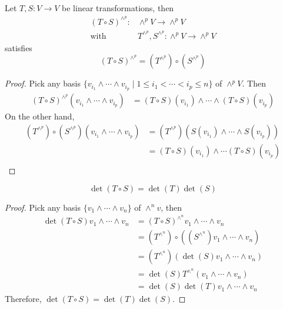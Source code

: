 \begin{proposition}
Let $T,S:V\to V$ be linear transformations, then
\[
\begin{array}{ll}
(T\circ S)^{\wedge^p}:&\wedge^pV\to \wedge^pV\\
\text{with}&T^{\wedge^p},S^{\wedge^p}:\wedge^pV\to \wedge^pV
\end{array}
\]
satisfies
\[
(T\circ S)^{\wedge^p} = (T^{\wedge^p})\circ(S^{\wedge^p})
\]
\end{proposition}

\begin{proof}
Pick any basis $\{v_{i_1}\wedge\cdots\wedge v_{i_p}\mid 1\le i_1<\cdots<i_p\le n\}$ of $\wedge^pV$.
Then
\begin{align*}
(T\circ S)^{\wedge^p}(v_{i_1}\wedge\cdots\wedge v_{i_p})&=
(T\circ S)(v_{i_1})\wedge\cdots\wedge(T\circ S)(v_{i_p})
\end{align*}
On  the other hand,
\begin{align*}
(T^{\wedge^p})\circ(S^{\wedge^p})(v_{i_1}\wedge\cdots\wedge v_{i_p})
&=
(T^{\wedge^p})(S(v_{i_1})\wedge\cdots\wedge S(v_{i_p}))\\
&=
(T\circ S)(v_{i_1})\wedge\cdots (T\circ S)(v_{i_p})\\
\end{align*}


\end{proof}

\begin{corollary}
\[
\det(T\circ S) = \det(T)\det(S)
\]
\end{corollary}

\begin{proof}
Pick any basis $\{v_1\wedge\cdots\wedge v_n\}$ of $\wedge^nv$, then
\begin{align*}
\det(T\circ S)v_1\wedge\cdots\wedge v_n
&=(T\circ S)^{\wedge^n}v_1\wedge\cdots\wedge v_n\\
&=(T^{\wedge^n})\circ((S^{\wedge^n})v_1\wedge\cdots\wedge v_n)\\
&=(T^{\wedge^n})(\det(S)v_1\wedge\cdots\wedge v_n)\\
&=\det(S)T^{\wedge^n}(v_1\wedge\cdots\wedge v_n)\\
&=\det(S)\det(T)v_1\wedge\cdots\wedge v_n
\end{align*}
Therefore, $\det(T\circ S) = \det(T)\det(S)$.


\end{proof}

